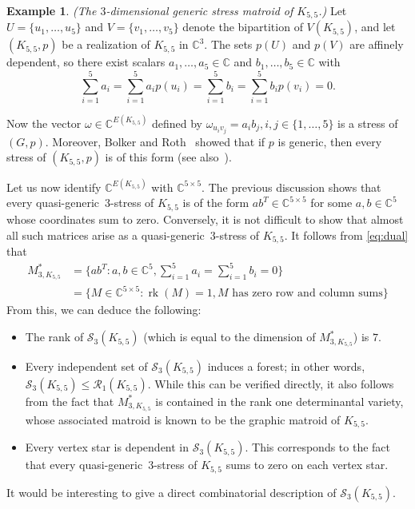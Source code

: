 \documentclass[11pt,a4paper,dvipsnames]{scrartcl}
\theoremstyle{definition}
\newtheorem{example}[theorem]{Example}
\DeclareMathOperator{\rk}{rk}
\newcommand{\CC}{\mathbb{C}}
\newcommand{\quasigen}{quasi-generic}
\begin{document}
\begin{example}\label{example:K55} \emph{(The $3$-dimensional generic stress matroid of $K_{5,5}$.)} \newline
    Let $U = \{u_1,\ldots,u_5\}$ and $V = \{v_1,\ldots,v_5\}$ denote the bipartition of $V(K_{5,5})$, and let $(K_{5,5},p)$ be a realization of $K_{5,5}$ in $\CC^3$. The sets $p(U)$ and $p(V)$ are affinely dependent, so there exist scalars $a_1,\ldots,a_5 \in \CC$ and $b_1,\ldots,b_5 \in \CC$ with \[\sum_{i=1}^5 a_i = \sum_{i=1}^5 a_ip(u_i) = \sum_{i=1}^5 b_i = \sum_{i=1}^5 b_ip(v_i) = 0.\]
    
    Now the vector $\omega \in \CC^{E(K_{5,5})}$ defined by $\omega_{u_iv_j} = a_ib_j, i,j \in \{1,\ldots,5\}$ is a stress of $(G,p)$.
    Moreover, Bolker and Roth~\cite{bolker.roth_1980} showed that if $p$ is generic, then every stress of $(K_{5,5},p)$ is of this form (see also~\cite[Section 3.4]{gortler.etal_2010}).

    Let us now identify $\CC^{E(K_{5,5})}$ with $\CC^{5 \times 5}$. The previous discussion shows that every \quasigen\ $3$-stress of $K_{5,5}$ is of the form $ab^T \in \CC^{5 \times 5}$ for some $a,b \in \CC^5$ whose coordinates sum to zero. Conversely, it is not difficult to show that almost all such matrices arise as a \quasigen\ $3$-stress of $K_{5,5}$. It follows from \cref{eq:dual} that \begin{align*}
        M_{3,K_{5,5}}^* &= \{ab^T : a,b \in \CC^5, \sum_{i=1}^5 a_i = \sum_{i=1}^5 b_i = 0\} \nonumber \\ & = \{M \in \CC^{5 \times 5}: \rk(M) = 1, M \text{ has zero row and column sums}\}
    \end{align*}
    From this, we can deduce the following:
    \begin{itemize}
        \item The rank of $\mathcal{S}_3(K_{5,5})$ (which is equal to the dimension of $M_{3,K_{5,5}}^*$) is $7$.
        \item Every independent set of $\mathcal{S}_3(K_{5,5})$ induces a forest; in other words,  $\mathcal{S}_3(K_{5,5}) \leq \mathcal{R}_1(K_{5,5})$. While this can be verified directly, it also follows from the fact that $M_{3,K_{5,5}}^*$ is contained in the rank one determinantal variety, whose associated matroid is known to be the graphic matroid of $K_{5,5}$.
        \item Every vertex star is dependent in $\mathcal{S}_3(K_{5,5})$. This corresponds to the fact that every \quasigen\ $3$-stress of $K_{5,5}$ sums to zero on each vertex star.
    \end{itemize}
    It would be interesting to give a direct combinatorial description of $\mathcal{S}_3(K_{5,5})$.
\end{example}
\end{document}
